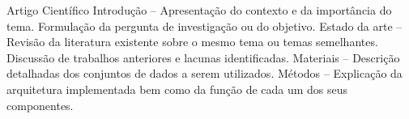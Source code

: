 Artigo Científico
Introdução – Apresentação do contexto e da importância do tema. Formulação da pergunta de investigação ou do objetivo. 
Estado da arte – Revisão da literatura existente sobre o mesmo tema ou temas semelhantes. Discussão de trabalhos anteriores e lacunas identificadas.
Materiais – Descrição detalhadas dos conjuntos de dados a serem utilizados.
Métodos – Explicação da arquitetura implementada bem como da função de cada um dos seus componentes. 

